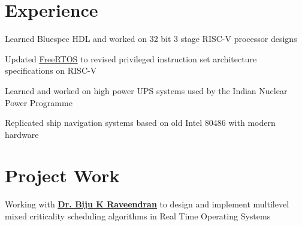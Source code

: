 \documentclass[]{illustris-resume-openfont}
\newcommand{\myul}[2][black]{\setulcolor{#1}\ul{#2}\setulcolor{black}}
\begin{document}
\hfill
\begin{minipage}[t]{0.66\textwidth} 


\section{Experience}

\vspace{\topsep} %
\begin{tightemize}\item Learned Bluespec HDL and worked on 32 bit 3 stage RISC-V processor designs
\item Updated \href{https://github.com/illustris/freertos-riscv}{\color{blue} \myul[blue] {FreeRTOS}} to revised privileged instruction set architecture specifications on RISC-V
\end{tightemize}
\sectionsep

\begin{tightemize}\item Learned and worked on high power UPS systems used by the Indian Nuclear Power Programme
\item Replicated ship navigation systems based on old Intel 80486 with modern hardware                                                                                                                                                                                                                                                                                                                                                                                                                                                                 
\end{tightemize}


\section{Project Work}
Working with \textbf{\href{http://universe.bits-pilani.ac.in/goa/biju/profile}{\color{blue} \myul[blue] {Dr. Biju K Raveendran}}} to design and implement multilevel mixed criticality scheduling algorithms in Real Time Operating Systems
\sectionsep


\end{minipage}
\end{document}
